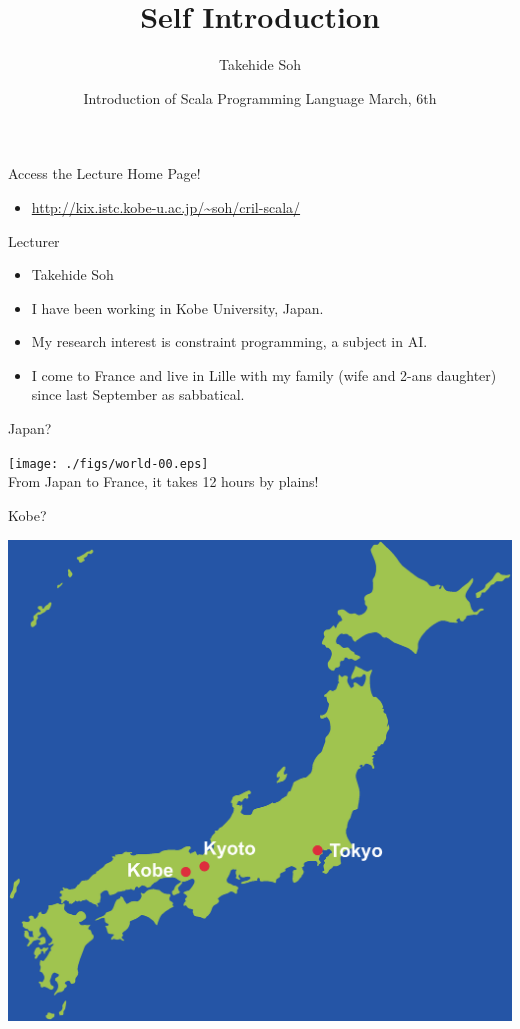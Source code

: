 \documentclass[compress,dvipdfmx,xcolor=table]{beamer}
\institute{$^{1}$Kobe University, Japan \and $^{2}$CRIL-CNRS UMR 8188, France}
\author{Takehide Soh\inst{1}}
\date{Introduction of Scala Programming Language \newline March, 6th}
\title{Self Introduction}
\renewcommand{\maketitle}{}
\begin{document}
\maketitle

\section{}
\label{sec:orgheadline6}
\begin{frame}[label={sec:orgheadline1}]{Access the Lecture Home Page!}
\begin{itemize}
\item \url{http://kix.istc.kobe-u.ac.jp/~soh/cril-scala/}
\end{itemize}
\end{frame}

\begin{frame}[label={sec:orgheadline2}]{Lecturer}
\begin{itemize}
\item Takehide Soh
\item I have been working in Kobe University, Japan.
\item My research interest is constraint programming, a subject in AI.
\item I come to France and live in Lille with my family (wife and 2-ans
daughter) since last September as sabbatical.
\end{itemize}
\end{frame}

\begin{frame}[label={sec:orgheadline3}]{Japan?}
\begin{center}
\texttt{[image: ./figs/world-00.eps]}\\
From Japan to France, it takes 12 hours by plains!
\end{center}
\end{frame}

\begin{frame}[label={sec:orgheadline4}]{Kobe?}
\begin{center}
\includegraphics[width=0.65\hsize]{./figs/japan-00.eps}
\end{center}
\end{frame}
\end{document}

